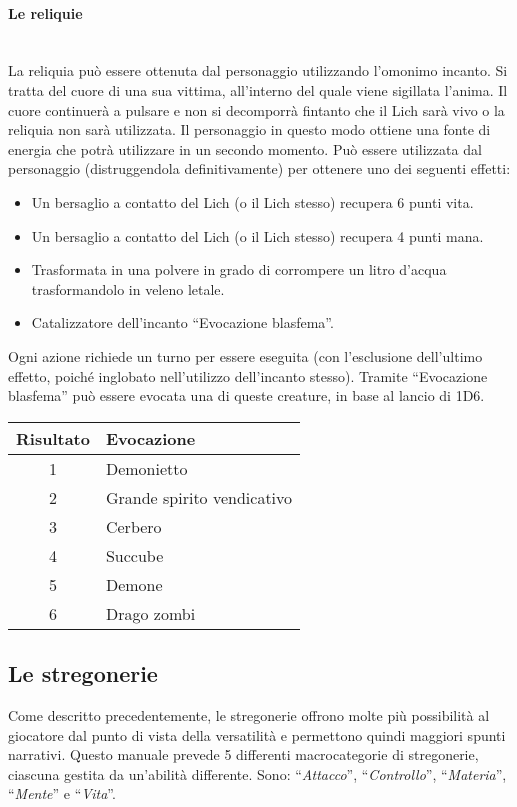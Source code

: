 \documentclass[../manuale_main.tex]{subfiles}
\begin{document}
\clearpage

\paragraph{Le reliquie}\mbox{}\\
La reliquia può essere ottenuta dal personaggio utilizzando l'omonimo incanto. Si tratta del cuore di una sua vittima, all’interno del quale viene sigillata l’anima. Il cuore continuerà a pulsare e non si decomporrà fintanto che il Lich sarà vivo o la reliquia non sarà utilizzata. Il personaggio in questo modo ottiene una fonte di energia che potrà utilizzare in un secondo momento. Può essere utilizzata dal personaggio (distruggendola definitivamente) per ottenere uno dei seguenti effetti:
\begin{itemize}
\item Un bersaglio a contatto del Lich (o il Lich stesso) recupera 6 punti vita.
\item Un bersaglio a contatto del Lich (o il Lich stesso) recupera 4 punti mana.
\item Trasformata in una polvere in grado di corrompere un litro d'acqua trasformandolo in veleno letale.
\item Catalizzatore dell’incanto “Evocazione blasfema”.
\end{itemize}
Ogni azione richiede un turno per essere eseguita (con l'esclusione dell'ultimo effetto, poiché inglobato nell'utilizzo dell’incanto stesso).
Tramite ``Evocazione blasfema'' può essere evocata una di queste creature, in base al lancio di 1D6.

\begin{tabularx}{\linewidth}{|c |l|}
\hline
\textbf{Risultato}&\textbf{Evocazione}\\ \hline
1&Demonietto\\ \hline
2&Grande spirito vendicativo\\ \hline
3&Cerbero\\ \hline
4&Succube\\ \hline
5&Demone\\ \hline
6&Drago zombi\\ \hline
\end{tabularx}

\clearpage
\subsection{Le stregonerie}
Come descritto precedentemente, le stregonerie offrono molte più possibilità al giocatore dal punto di vista della versatilità e permettono quindi maggiori spunti narrativi.
Questo manuale prevede 5 differenti macrocategorie di stregonerie, ciascuna gestita da un'abilità differente.
Sono: ``\emph{Attacco}'', ``\emph{Controllo}'', ``\emph{Materia}'', ``\emph{Mente}'' e ``\emph{Vita}''.\\
\end{document}
